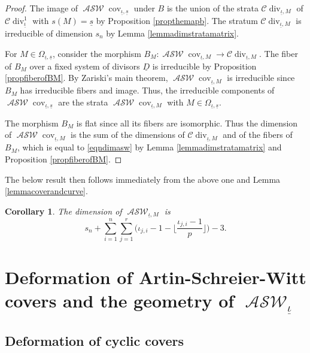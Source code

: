 \documentclass{compositio}
\newtheorem{corollary}[theorem]{Corollary}
\theoremstyle{remark}
\theoremstyle{remark}
\DeclareMathOperator{\cov}{cov}
\DeclareMathOperator{\divisor}{div}
\DeclareMathOperator{\ASW}{\mathcal{ASW}}
\begin{document}
\begin{proof}
The image of $\ASW\cov_{\underline{\iota}, \underline{s}}$ under $B$ is the union of the strata $\mathcal{C}\divisor_{\underline{\iota},M}$ of $\mathcal{C}\divisor^1_{\underline{\iota}}$ with $s(M)=\underline{s}$ by Proposition \ref{propthemapb}. The stratum $\mathcal{C}\divisor_{\underline{\iota},M}$ is irreducible of dimension $s_n$ by Lemma \ref{lemmadimstratamatrix}.

For $M \in \Omega_{\underline{\iota}, \underline{s}}$, consider the morphism $B_M: \ASW\cov_{\underline{\iota}, M} \xrightarrow{} \mathcal{C}\divisor_{\underline{\iota}, M}$. The fiber of $B_M$ over a fixed system of divisors $\underline{D}$ is irreducible by Proposition \ref{propfiberofBM}. By Zariski's main theorem, $\ASW\cov_{\underline{\iota}, M}$ is irreducible since $B_M$ has irreducible fibers and image. Thus, the irreducible components of $\ASW\cov_{\underline{\iota}, \underline{s}}$ are the strata $\ASW\cov_{\underline{\iota}, M}$ with $M \in \Omega_{\underline{\iota}, \underline{s}}$.

The morphism $B_M$ is flat since all its fibers are isomorphic. Thus the dimension of $\ASW\cov_{\underline{\iota}, M}$ is the sum of the dimensions of $\mathcal{C}\divisor_{\underline{\iota},M}$ and of the fibers of $B_M$, which is equal to \eqref{eqndimasw} by Lemma \ref{lemmadimstratamatrix} and Proposition \ref{propfiberofBM}. 
\end{proof}

The below result then follows immediately from the above one and Lemma \ref{lemmacoverandcurve}.

\begin{corollary}
The dimension of $\ASW_{\underline{\iota},M}$ is
\begin{equation}
    s_n+ \sum_{i=1}^n\sum_{j=1}^r \bigg( {\iota_{j,i}}-1 - \bigg\lfloor \frac{\iota_{j,i}-1}{p} \bigg\rfloor \bigg)-3.
\end{equation}
\end{corollary}





\section{Deformation of Artin-Schreier-Witt covers and the geometry of \texorpdfstring{$\ASW_{\underline{\iota}}$}{} }
\label{secdeformation}

\subsection{Deformation of cyclic covers}
\end{document}
